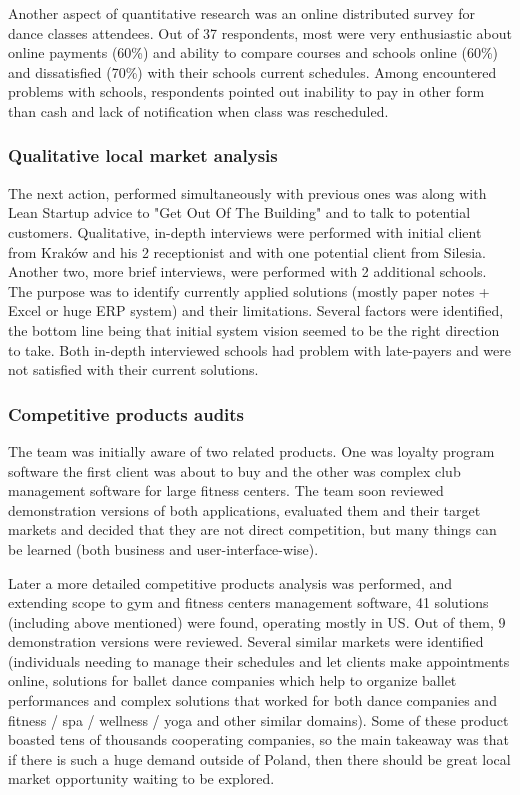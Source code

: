 \documentclass{article}
\begin{document}
Another aspect of quantitative research was an online distributed survey for dance classes attendees. Out of 37 respondents, most were very enthusiastic about online payments (60\%) and ability to compare courses and schools online (60\%) and dissatisfied (70\%) with their schools current schedules. Among encountered problems with schools, respondents pointed out inability to pay in other form than cash and lack of notification when class was rescheduled.

\subsubsection{Qualitative local market analysis}
The next action, performed simultaneously with previous ones was along with Lean Startup advice to "Get Out Of The Building" and to talk to potential customers. Qualitative, in-depth interviews were performed with initial client from Kraków and his 2 receptionist and with one potential client from Silesia. Another two, more brief interviews, were performed with 2 additional schools. The purpose was to identify currently applied solutions (mostly paper notes + Excel or huge ERP system) and their limitations. Several factors were identified, the bottom line being that initial system vision seemed to be the right direction to take. Both in-depth interviewed schools had problem with late-payers and were not satisfied with their current solutions.

\subsubsection{Competitive products audits}
The team was initially aware of two related products. One was loyalty program software the first client was about to buy and the other was complex club management software for large fitness centers. The team soon reviewed demonstration versions of both applications, evaluated them and their target markets and decided that they are not direct competition, but many things can be learned (both business and user-interface-wise).

Later a more detailed competitive products analysis was performed, and extending scope to gym and fitness centers management software, 41 solutions (including above mentioned) were found, operating mostly in US. Out of them, 9 demonstration versions were reviewed. Several similar markets were identified (individuals needing to manage their schedules and let clients make appointments online, solutions for ballet dance companies which help to organize ballet performances and complex solutions that worked for both dance companies and fitness / spa / wellness / yoga and other similar domains). Some of these product boasted tens of thousands cooperating companies, so the main takeaway was that if there is such a huge demand outside of Poland, then there should be great local market opportunity waiting to be explored.
\end{document}
